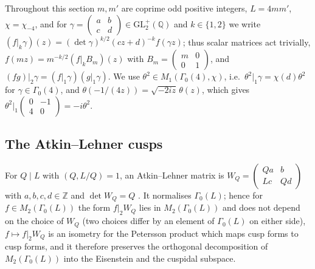 ﻿\documentclass[11pt]{amsart}
\theoremstyle{remark}
\newcommand{\Z}{\mathbb{Z}}
\begin{document}
Throughout this section $m,m'$ are coprime odd positive integers, $L=4mm'$, $\chi=\chi_{-4}$, and for $\gamma=\left(\begin{smallmatrix}a&b\\c&d\end{smallmatrix}\right)\in\mathrm{GL}_2^+(\mathbb Q)$ and $k\in\{1,2\}$ we write $(f|_k\gamma)(z)=(\det\gamma)^{k/2}(cz+d)^{-k}f(\gamma z)$; thus scalar matrices act trivially, $f(mz)=m^{-k/2}(f|_kB_m)(z)$ with $B_m=\left(\begin{smallmatrix}m&0\\0&1\end{smallmatrix}\right)$, and $(fg)|_2\gamma=(f|_1\gamma)(g|_1\gamma)$. We use $\theta^2\in M_1(\Gamma_0(4),\chi)$, i.e.\ $\theta^2|_1\gamma=\chi(d)\theta^2$ for $\gamma\in\Gamma_0(4)$, and $\theta(-1/(4z))=\sqrt{-2iz}\,\theta(z)$, which gives $\theta^2|_1\left(\begin{smallmatrix}0&-1\\4&0\end{smallmatrix}\right)=-i\theta^2$.

\subsection{The Atkin--Lehner cusps}
For $Q\mid L$ with $(Q,L/Q)=1$, an Atkin--Lehner matrix is $W_Q=\left(\begin{smallmatrix}Qa&b\\Lc&Qd\end{smallmatrix}\right)$ with $a,b,c,d\in\Z$ and $\det W_Q=Q$ \cite{AL}. It normalises $\Gamma_0(L)$; hence for $f\in M_2(\Gamma_0(L))$ the form $f|_2W_Q$ lies in $M_2(\Gamma_0(L))$ and does not depend on the choice of $W_Q$ (two choices differ by an element of $\Gamma_0(L)$ on either side), $f\mapsto f|_2W_Q$ is an isometry for the Petersson product which maps cusp forms to cusp forms, and it therefore preserves the orthogonal decomposition of $M_2(\Gamma_0(L))$ into the Eisenstein and the cuspidal subspace.
\end{document}
